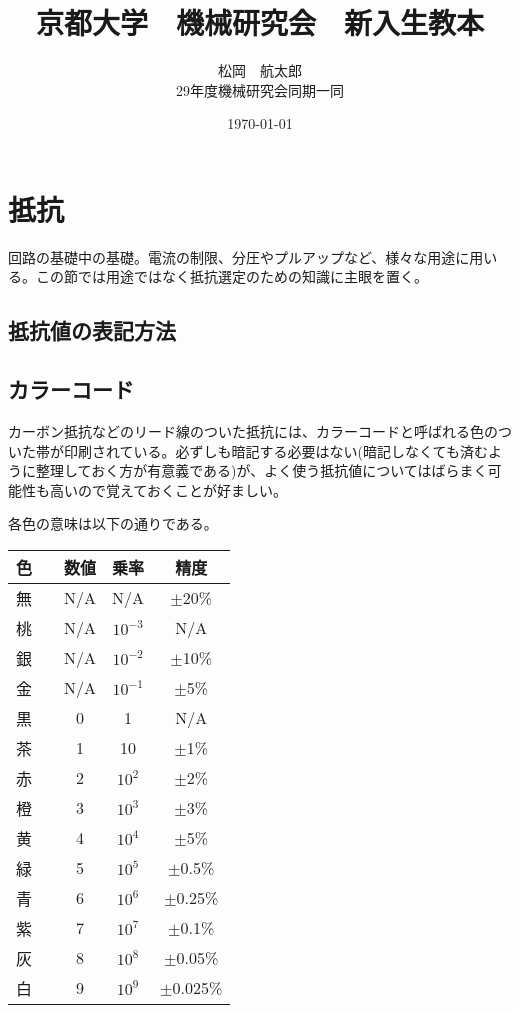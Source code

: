 \documentclass[a4paper,titlepage]{ujarticle}
\title{京都大学　機械研究会　新入生教本}
\date{\today}
\author{松岡　航太郎\\29年度機械研究会同期一同}
\begin{document}
\maketitle
\section{抵抗}
回路の基礎中の基礎。電流の制限、分圧やプルアップなど、様々な用途に用いる。この節では用途ではなく抵抗選定のための知識に主眼を置く。
\subsection{抵抗値の表記方法}
\subsection{カラーコード}
カーボン抵抗などのリード線のついた抵抗には、カラーコードと呼ばれる色のついた帯が印刷されている。必ずしも暗記する必要はない(暗記しなくても済むように整理しておく方が有意義である)が、よく使う抵抗値についてはばらまく可能性も高いので覚えておくことが好ましい。

各色の意味は以下の通りである。

\begin{table}[H]
	\begin{tabular}{|cc|c|c|c|}\hline
		色&&数値&乗率&精度\\ \hline
		無&&N/A&N/A&$\pm$20\%\\ \hline
		桃&\cellcolor[rgb]{1,0.412,0.706}{　}&N/A&$10^{-3}$&N/A\\ \hline
		銀&\cellcolor[rgb]{0.753,0.753,0.753}{　}&N/A&$10^{-2}$&$\pm$10\%\\ \hline
		金&\cellcolor[rgb]{0.812,0.71,0.231}{　}&N/A&$10^{-1}$&$\pm$5\%\\ \hline
		黒&\cellcolor{black}{　}&0&1&N/A\\ \hline
		茶&\cellcolor[rgb]{0.647059,0.164706,0.164706}{　}&1&10&$\pm$1\%\\ \hline
		赤&\cellcolor{red}{　}&2&$10^2$&$\pm$2\%\\ \hline
		橙&\cellcolor[rgb]{0.894118,0.368627,0}{　}&3&$10^3$&$\pm$3\% \\ \hline
		黄&\cellcolor{yellow}{　}&4&$10^4$&$\pm$5\%\\ \hline
		緑&\cellcolor{green}{　}&5&$10^5$&$\pm$0.5\%\\ \hline
		青&\cellcolor{blue}{　}&6&$10^6$&$\pm$0.25\%\\ \hline
		紫&\cellcolor[rgb]{0.58,0,0.827}{　}&7&$10^7$&$\pm$0.1\%\\ \hline
		灰&\cellcolor[rgb]{0.627,0.627,0.627}{　}&8&$10^8$&$\pm$0.05\%\\ \hline
		白&\cellcolor[rgb]{1,1,1}{　}&9&$10^9$&$\pm$0.025\%\\ \hline
	\end{tabular}
\end{table}
\end{document}

